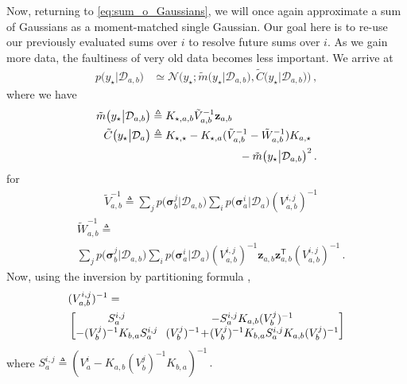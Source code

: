 \documentclass{article}
\newcommand{\cm}[1]{\ensuremath{\mathcal{#1}}}
\newcommand{\bm}[1]{\ensuremath{\mathbf{#1}}}
\newcommand{\data}{\ensuremath{\cm{D}}}
\newcommand{\vect}[1]{\bm{#1}}
\newcommand{\vz}{\vect{z}}
\newcommand{\vs}{\vect{\sigma}}
\newcommand{\amean}[2]{\tilde{{m}}\bigl(#1\big\vert#2\bigr)}
\newcommand{\acov}[2]{\tilde{{C}}\bigl(#1\big\vert#2\bigr)}
\newcommand{\p}[2]{p\bigl(#1\big\vert#2\bigr)}
\newcommand{\fPr}{p}
\newcommand{\Prob}[2]{\fPr\bigl(#1\big\vert#2\bigr)}
\newcommand{\N}[3]{\cm{N}\bigl(#1;#2,#3\bigr)}
\newcommand{\st}{_{\star}}
\newcommand{\tr}{\ensuremath{\mathsf{T}}}
\newcommand{\defequal}{\triangleq}
\begin{document}
Now, returning to \eqref{eq:sum_o_Gaussians}, we will once again approximate a sum of Gaussians  as a moment-matched single Gaussian. Our goal here is to re-use our previously evaluated sums over $i$ to resolve future sums over $i$. As we gain more data, the faultiness of very old data becomes less important. We arrive at
\begin{align}
\p{y\st}{\data_{a,b}} & \simeq \N{y\st}{\amean{y\st}{\data_{a,b}}}{\acov{y\st}{\data_{a,b}}}\,,\label{eq:pyab}
\end{align}
where we have
\begin{align}
\amean{y\st}{\data_{a,b}} & \defequal  K_{\star,a,b} \tilde{V}_{a,b}^{-1} \vz_{a,b}\label{eq:ameanab}\\
\acov{y\st}{\data_{a}}
& \defequal K_{\star,\star} - K_{\star,a}(\tilde{V}_{a,b}^{-1}-\tilde{W}_{a,b}^{-1})K_{a,\star} \nonumber\\
& \hspace{2.8cm} - \amean{y\st}{\data_{a,b}}^2 \,.\label{eq:acovab}
\end{align}
for
\begin{align*}
 & \tilde{V}^{-1}_{a,b} \defequal 
\sum_{j} \Prob{\vs^j_{b}}{\data_{a,b}}\sum_i \Prob{\vs^i_{a}}{\data_{a}} (V_{a,b}^{i,j})^{-1}
\end{align*}
\begin{align*}
 & \tilde{W}^{-1}_{a,b} \defequal \nonumber\\ 
& \sum_{j} \Prob{\vs^j_{b}}{\data_{a,b}}\sum_i \Prob{\vs^i_{a}}{\data_{a}} (V_{a,b}^{i,j})^{-1}\vz_{a,b}^{\phantom{\tr}} \vz_{a,b}^\tr (V_{a,b}^{i,j})^{-1}\,.
\end{align*}
Now, using the inversion by partitioning formula \citep[Section 2.7]
{NumericalRecipes},
\begin{align*}
\hspace{-0.2cm}&({V}^{i,j}_{a,b})^{-1} = \\
&\begin{bmatrix}
 S^{i,j}_a &\hspace{-0.1cm} -S^{i,j}_a K_{a,b} (V^j_b)^{-1} \\
 - (V^j_b)^{-1} K_{b,a} S^{i,j}_a &\hspace{-0.1cm} (V^j_b)^{-1}\!+\!(V^j_b)^{-1} K_{b,a} S^{i,j}_a K_{a,b} (V^j_b)^{-1} 
\end{bmatrix}
\end{align*}
where
$
S^{i,j}_a \defequal (V^i_a -K_{a,b} (V^j_b)^{-1}K_{b,a})^{-1}\,.
$
\end{document}
